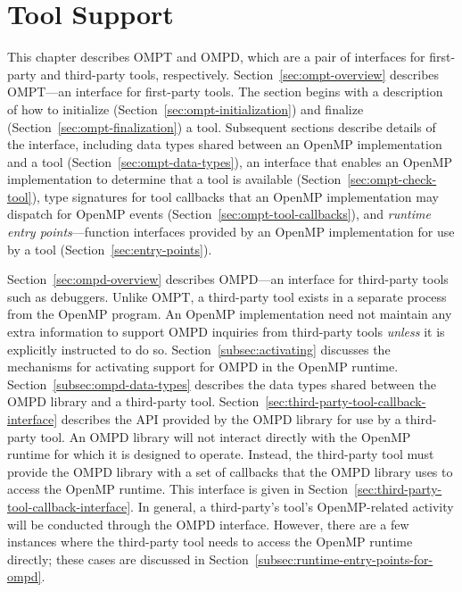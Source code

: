 \chapter{Tool Support}
\label{chap:ToolsSupport}



This chapter describes OMPT and OMPD, which are a pair of interfaces for first-party and third-party
tools, respectively.  Section~\ref{sec:ompt-overview} describes OMPT---an interface for first-party tools.
The section begins with a description of how to initialize (Section~\ref{sec:ompt-initialization})
and finalize (Section~\ref{sec:ompt-finalization}) a tool.
Subsequent sections describe details of the interface, including
data types shared between an OpenMP implementation and a tool
(Section~\ref{sec:ompt-data-types}),
an interface that enables an OpenMP implementation to determine that a
tool is available (Section~\ref{sec:ompt-check-tool}),
type signatures for tool callbacks
that an OpenMP implementation may dispatch for OpenMP events
(Section~\ref{sec:ompt-tool-callbacks}), and
\emph{runtime entry points}---function interfaces
provided by an OpenMP implementation for use by a tool
(Section~\ref{sec:entry-points}).

Section~\ref{sec:ompd-overview} describes
OMPD---an interface for  third-party tools such as debuggers.
Unlike OMPT, a third-party tool exists in a separate process from
the OpenMP program.
An OpenMP implementation need not maintain any extra information to support OMPD inquiries from third-party tools
\emph{unless} it is explicitly instructed to do so.
Section~\ref{subsec:activating} discusses the mechanisms for
activating support for OMPD in the OpenMP runtime.
Section~\ref{subsec:ompd-data-types}  describes the data types shared between the OMPD library and a third-party tool.
Section~\ref{sec:third-party-tool-callback-interface} describes the API provided by the OMPD library for use by a third-party tool.
An OMPD library will not interact directly with the OpenMP
runtime for which it is designed to operate.
Instead, the third-party tool must provide the OMPD library with a set of
callbacks that the OMPD library uses to access the OpenMP runtime.
This interface is given in
Section~\ref{sec:third-party-tool-callback-interface}.
In general, a third-party's tool's OpenMP-related activity will be
conducted through the OMPD interface.
However, there are a few instances where the third-party tool needs
to access the OpenMP runtime directly;
these cases are discussed in
Section~\ref{subsec:runtime-entry-points-for-ompd}.

